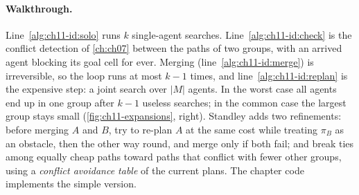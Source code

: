 \begin{algorithm}[!htb]
\caption{Simple independence detection}
\label{alg:ch11-id}
\end{algorithm}

\paragraph{Walkthrough.} Line~\ref{alg:ch11-id:solo} runs $k$ single-agent
searches. Line~\ref{alg:ch11-id:check} is the conflict detection of
\cref{ch:ch07} between the paths of two groups, with an arrived agent
blocking its goal cell for ever. Merging (line~\ref{alg:ch11-id:merge}) is
irreversible, so the loop runs at most $k - 1$ times, and
line~\ref{alg:ch11-id:replan} is the expensive step: a joint search over
$|M|$ agents. In the worst case all agents end up in one group after $k - 1$
useless searches; in the common case the largest group stays small
(\cref{fig:ch11-expansions}, right). Standley adds two refinements: before
merging $A$ and $B$, try to re-plan $A$ at the same cost while treating
$\pi_B$ as an obstacle, then the other way round, and merge only if both
fail; and break ties among equally cheap paths toward paths that conflict
with fewer other groups, using a \emph{conflict avoidance
table} of the current plans. The chapter
code implements the simple version.

